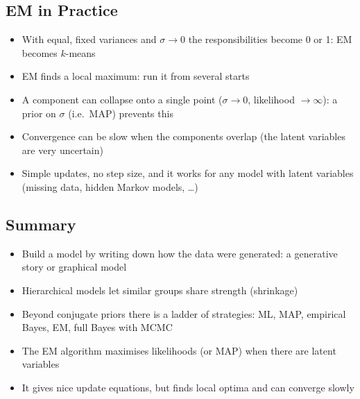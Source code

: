 \begin{slide}
\section{EM in Practice}

\begin{PauseHighLight}
  \begin{itemize}
  \item With equal, fixed variances and $\sigma\to0$ the
    responsibilities become 0 or 1: EM becomes $k$-means\pause
  \item EM finds a local maximum: run it from several starts\pause
  \item A component can collapse onto a single point ($\sigma\to0$,
    likelihood $\to\infty$)\pause{}: a prior on $\sigma$ (i.e.\ MAP)
    prevents this\pauseb
  \item Convergence can be slow when the components overlap (the
    latent variables are very uncertain)\pause
  \item Simple updates, no step size, and it works for any model with
    latent variables (missing data, hidden Markov models, \ldots)\pause
  \end{itemize}
\end{PauseHighLight}

\end{slide}


\begin{slide}
\section{Summary}

\begin{PauseHighLight}
  \begin{itemize}
  \item Build a model by writing down how the data were generated: a
    generative story or graphical model\pause
  \item Hierarchical models let similar groups share strength
    (shrinkage)\pause
  \item Beyond conjugate priors there is a ladder of strategies:
    ML, MAP, empirical Bayes, EM, full Bayes with MCMC\pause
  \item The EM algorithm maximises likelihoods (or MAP) when there are
    latent variables\pause
  \item It gives nice update equations, but finds local optima and can
    converge slowly\pause
  \end{itemize}
\end{PauseHighLight}

\end{slide}




